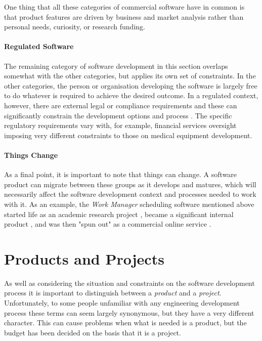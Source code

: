 One thing that all these categories of commercial software have in common is that product features are driven by business and market analysis rather than personal needs, curiosity, or research funding.

\paragraph{Regulated Software}

The remaining category of software development in this section overlaps somewhat with the other categories, but applies its own set of constraints. In the other categories, the person or organisation developing the software is largely free to do whatever is required to achieve the desired outcome. In a regulated context, however, there are external legal or compliance requirements and these can significantly constrain the development options and process . The specific regulatory requirements vary with, for example, financial services oversight imposing very different constraints to those on medical equipment development.

\paragraph{Things Change}

As a final point, it is important to note that things can change. A software product can migrate between these groups as it develops and matures, which will necessarily affect the software development context and processes needed to work with it. As an example, the \emph{Work Manager} scheduling software mentioned above started life as an academic research project \citep{Lesaint2003}, became a significant internal product \citep{Garwood1997}, and was then "spun out" as a commercial online service \citep{Trimble2006}.

\section{Products and Projects}
\label{section:products and projects}

As well as considering the situation and constraints on the software development process it is important to distinguish between a \emph{product} and a \emph{project}. Unfortunately, to some people unfamiliar with any engineering development process these terms can seem largely synonymous, but they have a very different character. This can cause problems when what is needed is a product, but the budget has been decided on the basis that it is a project.


